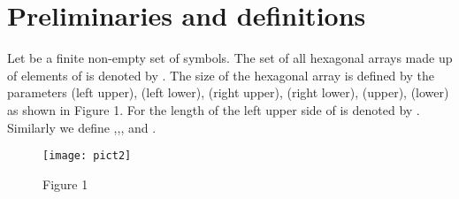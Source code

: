 \documentclass[11pt]{article}
\begin{document}
\section{Preliminaries and definitions}
Let  be a finite non-empty set of symbols. The set of all
hexagonal arrays made up of elements of  is denoted by
. The size of the hexagonal array is defined by the
parameters (left upper), (left lower), (right upper),
(right lower), (upper), (lower) as shown in Figure 1.
For  the length of the left upper side of  is
denoted by . Similarly we define
,,, and .


\begin{figure}
    \begin{center}
        \texttt{[image: pict2]}
    \end{center}
    \centerline{Figure 1}
\end{figure}
\end{document}
